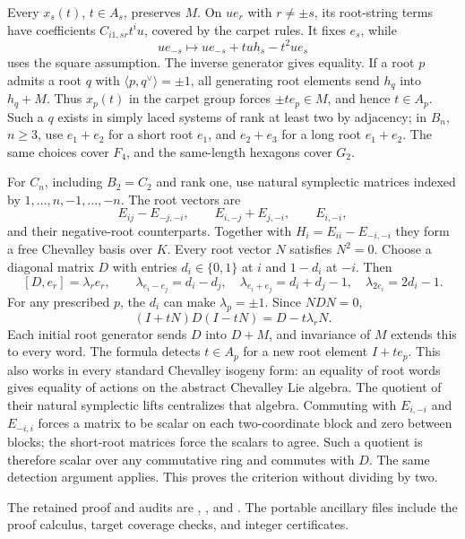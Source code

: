 Every \(x_s(t)\), \(t\in A_s\), preserves \(M\).
On \(ue_r\) with \(r\ne\pm s\), its root-string terms have
coefficients \(C_{i1,sr}t^iu\), covered by the carpet rules.
It fixes \(e_s\), while
\[
 ue_{-s}\longmapsto ue_{-s}+tu h_s-t^2u e_s
\]
uses the square assumption. The inverse generator gives equality.
If a root \(p\) admits a root \(q\) with
\(\langle p,q^\vee\rangle=\pm1\), all generating root elements
send \(h_q\) into \(h_q+M\). Thus \(x_p(t)\) in the carpet group
forces \(\pm te_p\in M\), and hence \(t\in A_p\).
Such a \(q\) exists in simply laced systems of rank at least two
by adjacency; in \(B_n\), \(n\ge3\), use \(e_1+e_2\) for a short
root \(e_1\), and \(e_2+e_3\) for a long root \(e_1+e_2\).
The same choices cover \(F_4\), and the same-length hexagons cover
\(G_2\).

For \(C_n\), including \(B_2=C_2\) and rank one, use natural
symplectic matrices indexed by \(1,\ldots,n,-1,\ldots,-n\).
The root vectors are
\[
 E_{ij}-E_{-j,-i},\qquad E_{i,-j}+E_{j,-i},\qquad E_{i,-i},
\]
and their negative-root counterparts. Together with
\(H_i=E_{ii}-E_{-i,-i}\) they form a free Chevalley basis over \(K\).
Every root vector \(N\) satisfies \(N^2=0\).
Choose a diagonal matrix \(D\) with entries \(d_i\in\{0,1\}\)
at \(i\) and \(1-d_i\) at \(-i\). Then
\[
 [D,e_r]=\lambda_re_r,\qquad
 \lambda_{e_i-e_j}=d_i-d_j,\quad
 \lambda_{e_i+e_j}=d_i+d_j-1,\quad
 \lambda_{2e_i}=2d_i-1.
\]
For any prescribed \(p\), the \(d_i\) can make \(\lambda_p=\pm1\).
Since \(NDN=0\),
\[
 (I+tN)D(I-tN)=D-t\lambda_rN.
\]
Each initial root generator sends \(D\) into \(D+M\), and invariance
of \(M\) extends this to every word. The formula detects \(t\in A_p\)
for a new root element \(I+te_p\).
This also works in every standard Chevalley isogeny form:
an equality of root words gives equality of actions on the
abstract Chevalley Lie algebra. The quotient of their natural
symplectic lifts centralizes that algebra. Commuting with
\(E_{i,-i}\) and \(E_{-i,i}\) forces a matrix to be scalar on each
two-coordinate block and zero between blocks; the short-root
matrices force the scalars to agree. Such a quotient is therefore
scalar over any commutative ring and commutes with \(D\).
The same detection argument applies. This proves the criterion
without dividing by two.

The retained proof and audits are
,
, and
.
The portable ancillary files include the proof calculus, target
coverage checks, and integer certificates.
